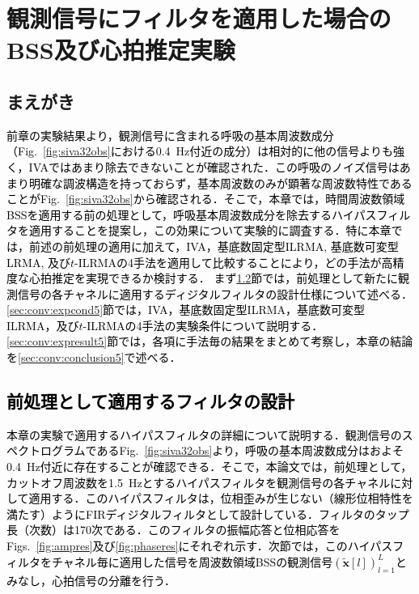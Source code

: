 \chapter{観測信号にフィルタを適用した場合のBSS及び心拍推定実験}
\label{chap:fbsshrexp}

\section{まえがき}
\textcolor{black}{前章の実験結果より，観測信号に含まれる呼吸の基本周波数成分（Fig.~\ref{fig:siva32obs}における0.4~Hz付近の成分）は相対的に他の信号よりも強く，IVAではあまり除去できないことが確認された．この呼吸のノイズ信号はあまり明確な調波構造を持っておらず，基本周波数のみが顕著な周波数特性であることがFig.~\ref{fig:siva32obs}から確認される．そこで，本章では，時間周波数領域BSSを適用する前の処理として，呼吸基本周波数成分を除去するハイパスフィルタを適用することを提案し，この効果について実験的に調査する．特に本章では，前述の前処理の適用に加えて，IVA，基底数固定型ILRMA, 基底数可変型LRMA, 及び$t$-ILRMAの4手法を適用して比較することにより，どの手法が高精度な心拍推定を実現できるか検討する．
まず\ref{sec:conv:filteroutline}節では，前処理として新たに観測信号の各チャネルに適用するディジタルフィルタの設計仕様について述べる．\ref{sec:conv:expcond5}節では，IVA，基底数固定型ILRMA，基底数可変型ILRMA，及び$t$-ILRMAの4手法の実験条件について説明する．\ref{sec:conv:expresult5}節では，各項に手法毎の結果をまとめて考察し，本章の結論を\ref{sec:conv:conclusion5}で述べる．}

\section{\textcolor{black}{前処理として適用するフィルタの設計}}
\label{sec:conv:filteroutline}
\textcolor{black}{本章の実験で適用するハイパスフィルタの詳細について説明する．観測信号のスペクトログラムであるFig.~\ref{fig:siva32obs}より，呼吸の基本周波数成分はおよそ0.4~Hz付近に存在することが確認できる．そこで，本論文では，前処理として，カットオフ周波数を1.5~Hzとするハイパスフィルタを観測信号の各チャネルに対して適用する．このハイパスフィルタは，位相歪みが生じない（線形位相特性を満たす）ようにFIRディジタルフィルタとして設計している．フィルタのタップ長（次数）は170次である．このフィルタの振幅応答と位相応答をFigs.~\ref{fig:ampres}及び\ref{fig:phaseres}にそれぞれ示す．次節では，このハイパスフィルタをチャネル毎に適用した信号を周波数領域BSSの観測信号$( \tilde{\bm{x}}[l] )_{l=1}^L$とみなし，心拍信号の分離を行う．}

